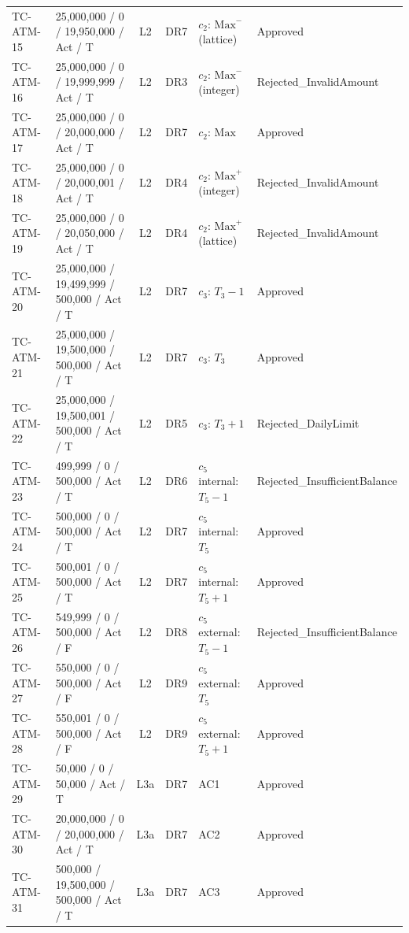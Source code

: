 \documentclass[11pt,a4paper]{article}
\begin{document}
\begin{xltabular}{\textwidth}{@{}l L{4.2cm} c c L{2.7cm} Y@{}}
TC-ATM-15 & 25{,}000{,}000 / 0 / 19{,}950{,}000 / Act / T & L2 & DR7 & \(c_2\): \(\mathrm{Max}^-\) (lattice) & Approved \\
TC-ATM-16 & 25{,}000{,}000 / 0 / 19{,}999{,}999 / Act / T & L2 & DR3 & \(c_2\): \(\mathrm{Max}^-\) (integer) & Rejected\_InvalidAmount \\
TC-ATM-17 & 25{,}000{,}000 / 0 / 20{,}000{,}000 / Act / T & L2 & DR7 & \(c_2\): \(\mathrm{Max}\) & Approved \\
TC-ATM-18 & 25{,}000{,}000 / 0 / 20{,}000{,}001 / Act / T & L2 & DR4 & \(c_2\): \(\mathrm{Max}^+\) (integer) & Rejected\_InvalidAmount \\
TC-ATM-19 & 25{,}000{,}000 / 0 / 20{,}050{,}000 / Act / T & L2 & DR4 & \(c_2\): \(\mathrm{Max}^+\) (lattice) & Rejected\_InvalidAmount \\
TC-ATM-20 & 25{,}000{,}000 / 19{,}499{,}999 / 500{,}000 / Act / T & L2 & DR7 & \(c_3\): \(T_3-1\) & Approved \\
TC-ATM-21 & 25{,}000{,}000 / 19{,}500{,}000 / 500{,}000 / Act / T & L2 & DR7 & \(c_3\): \(T_3\) & Approved \\
TC-ATM-22 & 25{,}000{,}000 / 19{,}500{,}001 / 500{,}000 / Act / T & L2 & DR5 & \(c_3\): \(T_3+1\) & Rejected\_DailyLimit \\
TC-ATM-23 & 499{,}999 / 0 / 500{,}000 / Act / T & L2 & DR6 & \(c_5\) internal: \(T_5-1\) & Rejected\_InsufficientBalance \\
TC-ATM-24 & 500{,}000 / 0 / 500{,}000 / Act / T & L2 & DR7 & \(c_5\) internal: \(T_5\) & Approved \\
TC-ATM-25 & 500{,}001 / 0 / 500{,}000 / Act / T & L2 & DR7 & \(c_5\) internal: \(T_5+1\) & Approved \\
TC-ATM-26 & 549{,}999 / 0 / 500{,}000 / Act / F & L2 & DR8 & \(c_5\) external: \(T_5-1\) & Rejected\_InsufficientBalance \\
TC-ATM-27 & 550{,}000 / 0 / 500{,}000 / Act / F & L2 & DR9 & \(c_5\) external: \(T_5\) & Approved \\
TC-ATM-28 & 550{,}001 / 0 / 500{,}000 / Act / F & L2 & DR9 & \(c_5\) external: \(T_5+1\) & Approved \\
\midrule
TC-ATM-29 & 50{,}000 / 0 / 50{,}000 / Act / T & L3a & DR7 & AC1 & Approved \\
TC-ATM-30 & 20{,}000{,}000 / 0 / 20{,}000{,}000 / Act / T & L3a & DR7 & AC2 & Approved \\
TC-ATM-31 & 500{,}000 / 19{,}500{,}000 / 500{,}000 / Act / T & L3a & DR7 & AC3 & Approved \\

\end{xltabular}
\end{document}
